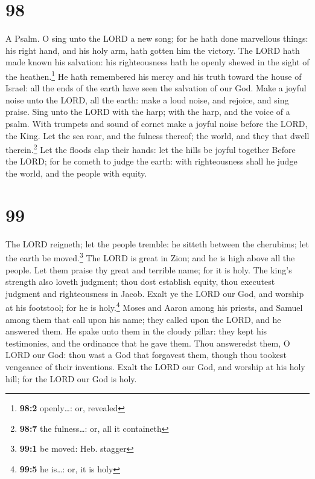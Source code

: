 \hypertarget{section-97}{%
\section{98}\label{section-97}}

A Psalm.  O sing unto the LORD a new song; for he hath
done marvellous things: his right hand, and his holy arm, hath gotten
him the victory.  The LORD hath made known his salvation:
his righteousness hath he openly shewed in the sight of the
heathen.\footnote{\textbf{98:2} openly\ldots: or, revealed}
 He hath remembered his mercy and his truth toward the
house of Israel: all the ends of the earth have seen the salvation of
our God.  Make a joyful noise unto the LORD, all the
earth: make a loud noise, and rejoice, and sing praise. 
Sing unto the LORD with the harp; with the harp, and the voice of a
psalm.  With trumpets and sound of cornet make a joyful
noise before the LORD, the King.  Let the sea roar, and
the fulness thereof; the world, and they that dwell therein.\footnote{\textbf{98:7}
  the fulness\ldots: or, all it containeth}  Let the
floods clap their hands: let the hills be joyful together 
Before the LORD; for he cometh to judge the earth: with righteousness
shall he judge the world, and the people with equity.

\hypertarget{section-98}{%
\section{99}\label{section-98}}

 The LORD reigneth; let the people tremble: he sitteth
between the cherubims; let the earth be moved.\footnote{\textbf{99:1} be
  moved: Heb. stagger}  The LORD is great in Zion; and he
is high above all the people.  Let them praise thy great
and terrible name; for it is holy.  The king's strength
also loveth judgment; thou dost establish equity, thou executest
judgment and righteousness in Jacob.  Exalt ye the LORD
our God, and worship at his footstool; for he is holy.\footnote{\textbf{99:5}
  he is\ldots: or, it is holy}  Moses and Aaron among his
priests, and Samuel among them that call upon his name; they called upon
the LORD, and he answered them.  He spake unto them in the
cloudy pillar: they kept his testimonies, and the ordinance that he gave
them.  Thou answeredst them, O LORD our God: thou wast a
God that forgavest them, though thou tookest vengeance of their
inventions.  Exalt the LORD our God, and worship at his
holy hill; for the LORD our God is holy.

